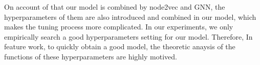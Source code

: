 \documentclass[sigconf]{acmart}
\begin{document}
On account of that our model is combined by node2vec and GNN, the hyperparameters of them are also introduced and combined in our model, which makes the tuning process more complicated. In our experiments, we only empirically search a good hyperparameters setting for our model. Therefore, In feature work, to quickly obtain a good model, the theoretic anaysis of the functions of these hyperparameters are highly motived.

\begin{acks}
\end{acks}




\end{document}
